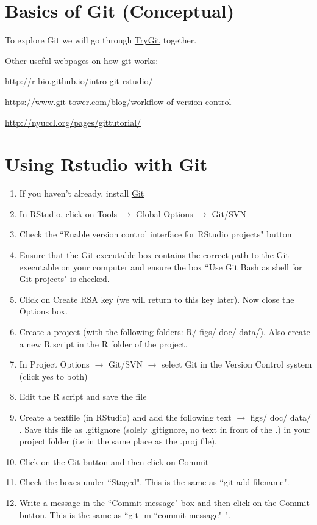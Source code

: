 \documentclass[12pt,letterpaper]{article} %
\begin{document}
\section*{Basics of Git (Conceptual)}
To explore Git we will go through \href{https://try.github.io/levels/1/challenges/1}{TryGit} together.

Other useful webpages on how git works:

\url{http://r-bio.github.io/intro-git-rstudio/}

\url{https://www.git-tower.com/blog/workflow-of-version-control}

\url{http://nyuccl.org/pages/gittutorial/}


\section*{Using Rstudio with Git}
\begin{enumerate}
\item If you haven't already, install \href{https://git-scm.com/download/}{Git}
\item In RStudio, click on Tools $\rightarrow$ Global Options $\rightarrow$ Git/SVN
\item Check the ``Enable version control interface for RStudio projects" button
\item Ensure that the Git executable box contains the correct path to the Git executable on your computer and ensure the box ``Use Git Bash as shell for Git projects" is checked.
\item Click on Create RSA key (we will return to this key later). Now close the Options box.
\item Create a project (with the following folders: R/ figs/ doc/ data/). Also create a new R script in the R folder of the project.
\item In Project Options $\rightarrow$ Git/SVN $\rightarrow$ select Git in the Version Control system (click yes to both)
\item Edit the R script and save the file
\item Create a textfile (in RStudio) and add the following text $\rightarrow$ figs/ doc/ data/ . Save this file as .gitignore (solely .gitignore, no text in front of the .) in your project folder (i.e in the same place as the .proj file).
\item Click on the Git button and then click on Commit
\item Check the boxes under ``Staged". This is the same as ``git add filename".
\item Write a message in the ``Commit message" box and then click on the Commit button. This is the same as ``git -m ``commit message" ".
\end{enumerate}
\end{document}
